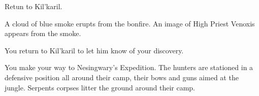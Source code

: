 Retun to Kil'karil.





A cloud of blue smoke erupts from the bonfire. An image of High Priest Venoxis appears from the smoke.






You return to Kil'karil to let him know of your discovery.


You make your way to Nesingwary's Expedition. The hunters are stationed in a defensive position all around their camp, their bows and guns aimed at the jungle. Serpents corpses litter the ground around their camp.







